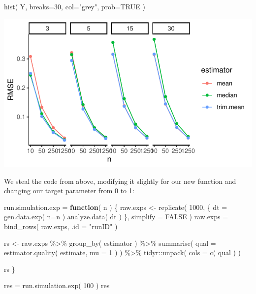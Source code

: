 \documentclass[
]{book}
\newenvironment{Shaded}{\begin{snugshade}}{\end{snugshade}}
\newcommand{\AttributeTok}[1]{\textcolor[rgb]{0.77,0.63,0.00}{#1}}
\newcommand{\ConstantTok}[1]{\textcolor[rgb]{0.00,0.00,0.00}{#1}}
\newcommand{\ControlFlowTok}[1]{\textcolor[rgb]{0.13,0.29,0.53}{\textbf{#1}}}
\newcommand{\DecValTok}[1]{\textcolor[rgb]{0.00,0.00,0.81}{#1}}
\newcommand{\FunctionTok}[1]{\textcolor[rgb]{0.00,0.00,0.00}{#1}}
\newcommand{\NormalTok}[1]{#1}
\newcommand{\OtherTok}[1]{\textcolor[rgb]{0.56,0.35,0.01}{#1}}
\newcommand{\SpecialCharTok}[1]{\textcolor[rgb]{0.00,0.00,0.00}{#1}}
\newcommand{\StringTok}[1]{\textcolor[rgb]{0.31,0.60,0.02}{#1}}
\begin{document}
\begin{Shaded}
\begin{Highlighting}[]
\FunctionTok{hist}\NormalTok{( Y, }\AttributeTok{breaks=}\DecValTok{30}\NormalTok{, }\AttributeTok{col=}\StringTok{"grey"}\NormalTok{, }\AttributeTok{prob=}\ConstantTok{TRUE}\NormalTok{ )}
\end{Highlighting}
\end{Shaded}

\begin{center}\includegraphics[width=0.75\linewidth]{Designing-Simulations-in-R_files/figure-latex/unnamed-chunk-174-1} \end{center}

We steal the code from above, modifying it slightly for our new function and
changing our target parameter from 0 to 1:

\begin{Shaded}
\begin{Highlighting}[]
\NormalTok{run.simulation.exp }\OtherTok{=} \ControlFlowTok{function}\NormalTok{( n ) \{}
\NormalTok{    raw.exps }\OtherTok{\textless{}{-}} \FunctionTok{replicate}\NormalTok{( }\DecValTok{1000}\NormalTok{, \{}
\NormalTok{        dt }\OtherTok{=} \FunctionTok{gen.data.exp}\NormalTok{( }\AttributeTok{n=}\NormalTok{n )}
        \FunctionTok{analyze.data}\NormalTok{( dt )}
\NormalTok{    \}, }\AttributeTok{simplify =} \ConstantTok{FALSE}\NormalTok{ )}
\NormalTok{    raw.exps }\OtherTok{=} \FunctionTok{bind\_rows}\NormalTok{( raw.exps, }\AttributeTok{.id =} \StringTok{"runID"}\NormalTok{ )}

\NormalTok{    rs }\OtherTok{\textless{}{-}}\NormalTok{ raw.exps }\SpecialCharTok{\%\textgreater{}\%}
        \FunctionTok{group\_by}\NormalTok{( estimator ) }\SpecialCharTok{\%\textgreater{}\%}
        \FunctionTok{summarise}\NormalTok{( }\AttributeTok{qual =} \FunctionTok{estimator.quality}\NormalTok{( estimate, }\AttributeTok{mu =} \DecValTok{1}\NormalTok{ ) ) }\SpecialCharTok{\%\textgreater{}\%}
\NormalTok{        tidyr}\SpecialCharTok{::}\FunctionTok{unpack}\NormalTok{( }\AttributeTok{cols =} \FunctionTok{c}\NormalTok{( qual ) )}

\NormalTok{    rs}
\NormalTok{\}}

\NormalTok{res }\OtherTok{=} \FunctionTok{run.simulation.exp}\NormalTok{( }\DecValTok{100}\NormalTok{ )}
\NormalTok{res}
\end{Highlighting}
\end{Shaded}
\end{document}

